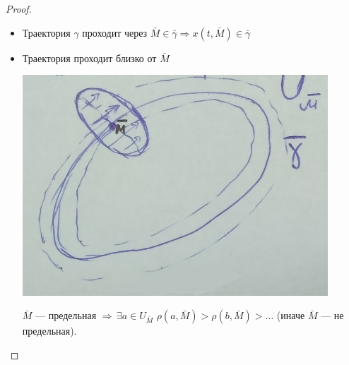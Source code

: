 	\begin{proof}
		\begin{itemize}
			\item Траектория $\gamma$ проходит через $\bar{M}\in\bar{\gamma}\Rightarrow x(t,\bar{M})	
																															\in\bar{\gamma}$
			\item Траектория проходит близко от $\bar{M}$
			\newline
			\begin{minipage}{0.3\textwidth}  \vspace{3mm}
				\begin{center} \includegraphics[width=0.9\textwidth]{ch8/pict/pict_10.png}\end{center} 
			\end{minipage}
				\hfill
			\begin{minipage}{0.6\textwidth} \vspace{4mm}
				\cntrKul $\bar{M}$ --- предельная $\Rightarrow \, \exists a \in U_{\bar{M}}$ \cntrKul \newline
				$\rho(a, \bar{M}) > \rho(b, \bar{M}) > \ldots $ (иначе $\bar{M}$ --- не предельная).
			\end{minipage}
				
		\end{itemize}
	\end{proof}
